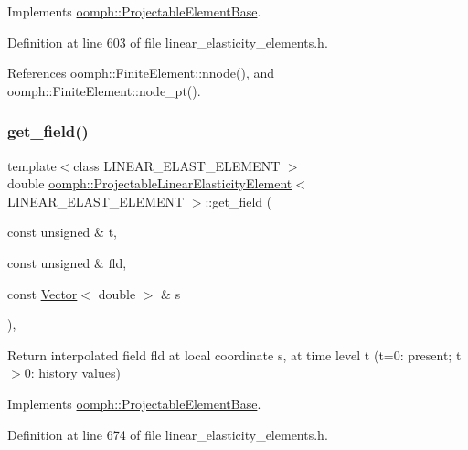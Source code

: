 Implements \hyperlink{classoomph_1_1ProjectableElementBase_a644306ebdf16f334344c2d27d72f18b7}{oomph\+::\+Projectable\+Element\+Base}.



Definition at line 603 of file linear\+\_\+elasticity\+\_\+elements.\+h.



References oomph\+::\+Finite\+Element\+::nnode(), and oomph\+::\+Finite\+Element\+::node\+\_\+pt().

\mbox{\label{classoomph_1_1ProjectableLinearElasticityElement_a00c02d888df64225d0e0e3e132496094}} 
\subsubsection{\texorpdfstring{get\+\_\+field()}{get\_field()}}
{\footnotesize\ttfamily template$<$class L\+I\+N\+E\+A\+R\+\_\+\+E\+L\+A\+S\+T\+\_\+\+E\+L\+E\+M\+E\+NT $>$ \\
double \hyperlink{classoomph_1_1ProjectableLinearElasticityElement}{oomph\+::\+Projectable\+Linear\+Elasticity\+Element}$<$ L\+I\+N\+E\+A\+R\+\_\+\+E\+L\+A\+S\+T\+\_\+\+E\+L\+E\+M\+E\+NT $>$\+::get\+\_\+field (\begin{DoxyParamCaption}\item[{const unsigned \&}]{t,  }\item[{const unsigned \&}]{fld,  }\item[{const \hyperlink{classoomph_1_1Vector}{Vector}$<$ double $>$ \&}]{s }\end{DoxyParamCaption})\hspace{0.3cm}{\ttfamily [inline]}, {\ttfamily [virtual]}}



Return interpolated field fld at local coordinate s, at time level t (t=0\+: present; t$>$0\+: history values) 



Implements \hyperlink{classoomph_1_1ProjectableElementBase_ae4da5b565b6d333be2f5920f7be763cd}{oomph\+::\+Projectable\+Element\+Base}.



Definition at line 674 of file linear\+\_\+elasticity\+\_\+elements.\+h.



